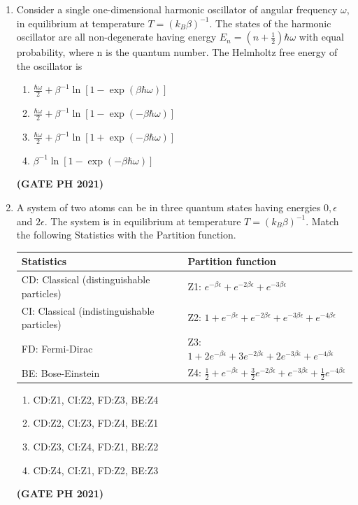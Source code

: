 \documentclass[14pt, a4paper]{extarticle}
\begin{document}
\begin{enumerate}[label=\textbf{Q.\arabic*}]
\begin{enumerate}[label=\textbf{Q.\arabic*}]
\item Consider a single one-dimensional harmonic oscillator of angular frequency $\omega$, in equilibrium at temperature $T = (k_B \beta)^{-1}$. The states of the harmonic oscillator are all non-degenerate having energy $E_n = \left(n+\frac{1}{2}\right)\hbar\omega$ with equal probability, where n is the quantum number. The Helmholtz free energy of the oscillator is
\begin{enumerate}
\item $\frac{\hbar\omega}{2} + \beta^{-1}\ln[1-\exp(\beta\hbar\omega)]$
\item $\frac{\hbar\omega}{2} + \beta^{-1}\ln[1-\exp(-\beta\hbar\omega)]$
\item $\frac{\hbar\omega}{2} + \beta^{-1}\ln[1+\exp(-\beta\hbar\omega)]$
\item $\beta^{-1}\ln[1-\exp(-\beta\hbar\omega)]$
\end{enumerate}
\hfill \textbf{(GATE PH 2021)}

\item A system of two atoms can be in three quantum states having energies $0, \epsilon$ and $2\epsilon$. The system is in equilibrium at temperature $T = (k_B\beta)^{-1}$. Match the following Statistics with the Partition function.
\begin{center}
\renewcommand{\arraystretch}{2.2}
\begin{tabular}{|p{5cm}|l|}
\hline
\textbf{Statistics} & \textbf{Partition function} \\
\hline
CD: Classical (distinguishable particles) & Z1: $e^{-\beta\epsilon} + e^{-2\beta\epsilon} + e^{-3\beta\epsilon}$ \\
\hline
CI: Classical (indistinguishable particles) & Z2: $1 + e^{-\beta\epsilon} + e^{-2\beta\epsilon} + e^{-3\beta\epsilon} + e^{-4\beta\epsilon}$ \\
\hline
FD: Fermi-Dirac & Z3: $1 + 2e^{-\beta\epsilon} + 3e^{-2\beta\epsilon} + 2e^{-3\beta\epsilon} + e^{-4\beta\epsilon}$ \\
\hline
BE: Bose-Einstein & Z4: $\frac{1}{2} + e^{-\beta\epsilon} + \frac{3}{2}e^{-2\beta\epsilon} + e^{-3\beta\epsilon} + \frac{1}{2}e^{-4\beta\epsilon}$ \\
\hline
\end{tabular}
\end{center}
\begin{enumerate}
\item CD:Z1, CI:Z2, FD:Z3, BE:Z4
\item CD:Z2, CI:Z3, FD:Z4, BE:Z1
\item CD:Z3, CI:Z4, FD:Z1, BE:Z2
\item CD:Z4, CI:Z1, FD:Z2, BE:Z3
\end{enumerate}
\hfill \textbf{(GATE PH 2021)}


\end{enumerate}
\end{enumerate}
\end{document}
